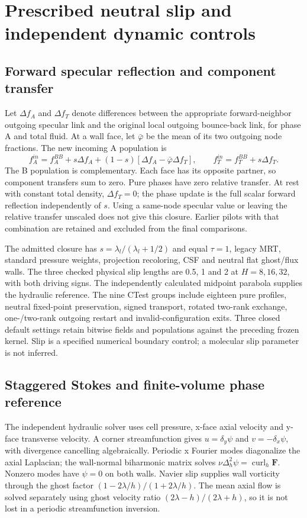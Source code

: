 \section{Prescribed neutral slip and independent dynamic controls}
\subsection{Forward specular reflection and component transfer}
Let $\Delta f_A$ and $\Delta f_T$ denote differences between the appropriate
forward-neighbor outgoing specular link and the original local outgoing
bounce-back link, for phase A and total fluid. At a wall face, let
$\bar\varphi$ be the mean of its two outgoing node fractions. The new
incoming A population is
\begin{equation}
 f_A^{in}=f_A^{BB}+s\Delta f_A+
 (1-s)[\Delta f_A-\bar\varphi\Delta f_T],\qquad
 f_T^{in}=f_T^{BB}+s\Delta f_T.
\end{equation}
The B population is complementary. Each face has its opposite partner,
so component transfers sum to zero. Pure phases have zero relative transfer.
At rest with constant total density, $\Delta f_T=0$; the phase update is
the full scalar forward reflection independently of $s$.
Using a same-node specular value or leaving the relative transfer unscaled
does not give this closure. Earlier pilots with that combination are
retained and excluded from the final comparisons.

The admitted closure has $s=\lambda_l/(\lambda_l+1/2)$ and equal
$\tau=1$, legacy MRT, standard pressure weights, projection recoloring,
CSF and neutral flat ghost/flux walls. The three checked physical slip
lengths are 0.5, 1 and 2 at $H=8,16,32$, with both driving signs.
The independently calculated midpoint parabola supplies the hydraulic
reference. The nine CTest groups include eighteen pure profiles,
neutral fixed-point preservation, signed transport, rotated two-rank
exchange, one-/two-rank outgoing restart and invalid-configuration exits.
Three closed default settings retain bitwise fields and populations
against the preceding frozen kernel. Slip is a specified numerical
boundary control; a molecular slip parameter is not inferred.

\subsection{Staggered Stokes and finite-volume phase reference}
The independent hydraulic solver uses cell pressure, x-face axial
velocity and y-face transverse velocity. A corner streamfunction gives
$u=\delta_y\psi$ and $v=-\delta_x\psi$, with divergence cancelling
algebraically. Periodic x Fourier modes diagonalize the axial Laplacian;
the wall-normal biharmonic matrix solves
$\nu\Delta_h^2\psi=\operatorname{curl}_h\bm F$. Nonzero modes have
$\psi=0$ on both walls. Navier slip supplies wall vorticity through
the ghost factor $(1-2\lambda/h)/(1+2\lambda/h)$. The mean axial flow is
solved separately using ghost velocity ratio
$(2\lambda-h)/(2\lambda+h)$, so it is not lost in a periodic
streamfunction inversion.

